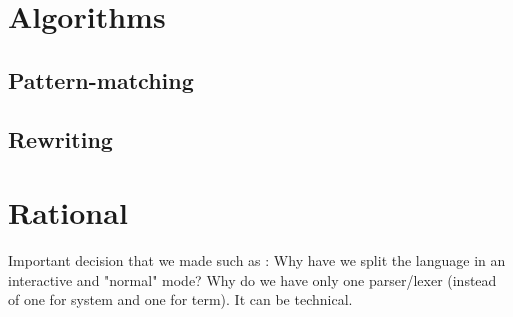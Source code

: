 \documentclass[12pt,a4paper]{article}
\begin{document}
\section{Algorithms}

\subsection{Pattern-matching}

\subsection{Rewriting}

\section{Rational}

Important decision that we made such as : Why have we split the language in an interactive and "normal" mode? Why do we have only one parser/lexer (instead of one for system and one for term). It can be technical.
\end{document}
